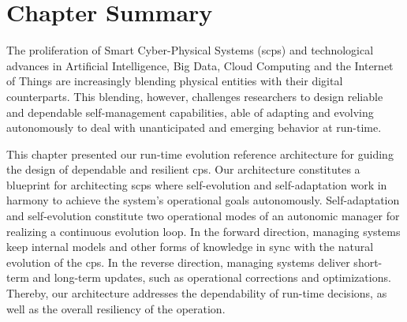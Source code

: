 \section{Chapter Summary}
\label{sect:reference-architecture--summary}

The proliferation of Smart Cyber-Physical Systems (\gls{scps}) and technological advances in Artificial Intelligence, Big Data, Cloud Computing and the Internet of Things are increasingly blending physical entities with their digital counterparts. This blending, however, challenges researchers to design reliable and dependable self-management capabilities, able of adapting and evolving autonomously to deal with unanticipated and emerging behavior at run-time.

This chapter presented our run-time evolution reference architecture for guiding the design of dependable and resilient \gls{cps}. Our architecture constitutes a blueprint for architecting \gls{scps} where self-evolution and self-adaptation work in harmony to achieve the system's operational goals autonomously. Self-adaptation and self-evolution constitute two operational modes of an autonomic manager for realizing a continuous evolution loop. In the forward direction, managing systems keep internal models and other forms of knowledge in sync with the natural evolution of the \gls{cps}. In the reverse direction, managing systems deliver short-term and long-term updates, such as operational corrections and optimizations. Thereby, our architecture addresses the dependability of run-time decisions, as well as the overall resiliency of the operation.

